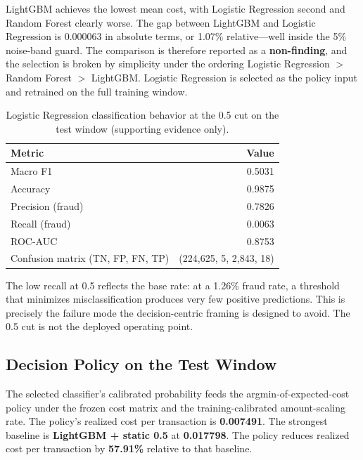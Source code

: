 \documentclass[conference]{IEEEtran}
\begin{document}
LightGBM achieves the lowest mean cost, with Logistic Regression second and
Random Forest clearly worse. The gap between LightGBM and Logistic
Regression is 0.000063 in absolute terms, or 1.07\% relative---well
inside the 5\% noise-band guard. The comparison is therefore reported as a
\textbf{non-finding}, and the selection is broken by simplicity under the
ordering Logistic Regression $>$ Random Forest $>$ LightGBM. Logistic
Regression is selected as the policy input and retrained on the full
training window.

\begin{table}[!t]
\caption{Logistic Regression classification behavior at the 0.5 cut on the
test window (supporting evidence only).}
\label{tab:cls}
\centering
\begin{tabular}{lr}
\toprule
Metric & Value \\
\midrule
Macro F1 & 0.5031 \\
Accuracy & 0.9875 \\
Precision (fraud) & 0.7826 \\
Recall (fraud) & 0.0063 \\
ROC-AUC & 0.8753 \\
Confusion matrix (TN, FP, FN, TP) & (224,625, 5, 2,843, 18) \\
\bottomrule
\end{tabular}
\end{table}

The low recall at 0.5 reflects the base rate: at a 1.26\% fraud rate, a
threshold that minimizes misclassification produces very few positive
predictions. This is precisely the failure mode the decision-centric
framing is designed to avoid. The 0.5 cut is not the deployed operating
point.

\subsection{Decision Policy on the Test Window}

The selected classifier's calibrated probability feeds the
argmin-of-expected-cost policy under the frozen cost matrix and the
training-calibrated amount-scaling rate. The policy's realized cost per
transaction is \textbf{0.007491}. The strongest baseline is \textbf{LightGBM
+ static 0.5} at \textbf{0.017798}. The policy reduces realized cost per
transaction by \textbf{57.91\%} relative to that baseline.
\end{document}
